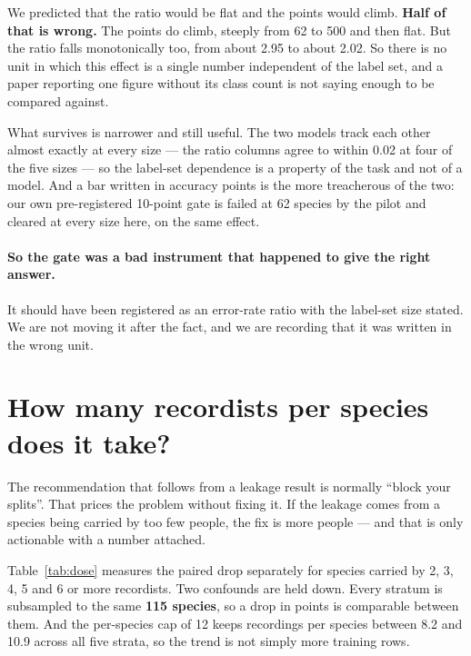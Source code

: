 \documentclass[10pt,twocolumn,a4paper]{article}
\begin{document}
We predicted that the ratio would be flat and the points would climb. \textbf{Half of that is
wrong.} The points do climb, steeply from 62 to 500 and then flat. But the ratio falls
monotonically too, from about 2.95 to about 2.02. So there is no unit in which this effect is
a single number independent of the label set, and a paper reporting one figure without its
class count is not saying enough to be compared against.

What survives is narrower and still useful. The two models track each other almost exactly at
every size --- the ratio columns agree to within 0.02 at four of the five sizes --- so the
label-set dependence is a property of the task and not of a model. And a bar written in
accuracy points is the more treacherous of the two: our own pre-registered 10-point gate is
failed at 62 species by the pilot and cleared at every size here, on the same effect.

\paragraph{So the gate was a bad instrument that happened to give the right answer.} It should
have been registered as an error-rate ratio with the label-set size stated. We are not moving
it after the fact, and we are recording that it was written in the wrong unit.

\section{How many recordists per species does it take?}
\label{sec:dose}

The recommendation that follows from a leakage result is normally ``block your splits''. That
prices the problem without fixing it. If the leakage comes from a species being carried by too
few people, the fix is more people --- and that is only actionable with a number attached.

Table~\ref{tab:dose} measures the paired drop separately for species carried by 2, 3, 4, 5 and
6 or more recordists. Two confounds are held down. Every stratum is subsampled to the same
\textbf{115 species}, so a drop in points is comparable between them. And the per-species cap of
12 keeps recordings per species between 8.2 and 10.9 across all five strata, so the trend is not
simply more training rows.
\end{document}
